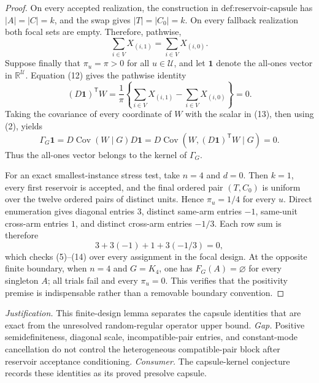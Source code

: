 \documentclass{article}
\begin{document}
\begin{proof}
On every accepted realization, the construction in \(\text{def:reservoir-capsule}\) has \(|A|=|C|=k\), and the swap gives \(|T|=|C_0|=k\).  On every fallback realization both focal sets are empty.  Therefore, pathwise,
\[
 \sum_{i\in V}X_{(i,1)}
 =\sum_{i\in V}X_{(i,0)}. \tag{12}
\]
Suppose finally that \(\pi_u=\pi>0\) for all \(u\in\mathcal U\), and let \(\mathbf 1\) denote the all-ones vector in \(\mathbb R^{\mathcal U}\).  Equation (12) gives the pathwise identity
\[
 (D\mathbf 1)^{\mathsf T}W
 =\frac{1}{\pi}
 \left\{
 \sum_{i\in V}X_{(i,1)}-\sum_{i\in V}X_{(i,0)}
 \right\}
 =0. \tag{13}
\]
Taking the covariance of every coordinate of \(W\) with the scalar in (13), then using (2), yields
\[
 \Gamma_G\mathbf 1
 =D\operatorname{Cov}(W\mid G)D\mathbf 1
 =D\operatorname{Cov}\!\left(W,(D\mathbf 1)^{\mathsf T}W\mid G\right)
 =0. \tag{14}
\]
Thus the all-ones vector belongs to the kernel of \(\Gamma_G\).

For an exact smallest-instance stress test, take \(n=4\) and \(d=0\).  Then \(k=1\), every first reservoir is accepted, and the final ordered pair \((T,C_0)\) is uniform over the twelve ordered pairs of distinct units.  Hence \(\pi_u=1/4\) for every \(u\).  Direct enumeration gives diagonal entries \(3\), distinct same-arm entries \(-1\), same-unit cross-arm entries \(1\), and distinct cross-arm entries \(-1/3\).  Each row sum is therefore
\[
 3+3(-1)+1+3(-1/3)=0, \tag{15}
\]
which checks (5)--(14) over every assignment in the focal design.  At the opposite finite boundary, when \(n=4\) and \(G=K_4\), one has \(F_G(A)=\varnothing\) for every singleton \(A\); all trials fail and every \(\pi_u=0\).  This verifies that the positivity premise is indispensable rather than a removable boundary convention.
\end{proof}
\par\smallskip\noindent \textit{Justification.} This finite-design lemma separates the capsule identities that are exact from the unresolved random-regular operator upper bound. \textit{Gap.} Positive semidefiniteness, diagonal scale, incompatible-pair entries, and constant-mode cancellation do not control the heterogeneous compatible-pair block after reservoir acceptance conditioning. \textit{Consumer.} The capsule-kernel conjecture records these identities as its proved presolve capsule.
\end{document}

